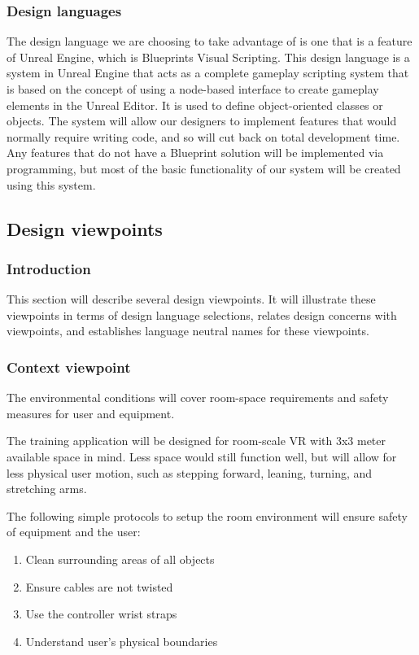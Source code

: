 \documentclass[onecolumn, draftclsnofoot,10pt, compsoc]{IEEEtran}
\begin{document}
\subsubsection{Design languages}
The design language we are choosing to take advantage of is one that is a feature of Unreal Engine, which is Blueprints Visual Scripting. This design language is a system in Unreal Engine that acts as a complete gameplay scripting system that is based on the concept of using a node-based interface to create gameplay elements in the Unreal Editor. It is used to define object-oriented classes or objects. The system will allow our designers to implement features that would normally require writing code, and so will cut back on total development time. Any features that do not have a Blueprint solution will be implemented via programming, but most of the basic functionality of our system will be created using this system.

\newpage

\subsection{Design viewpoints}
\subsubsection{Introduction}
This section will describe several design viewpoints. It will illustrate these viewpoints in terms of design language selections, relates design concerns with viewpoints, and establishes language neutral names for these viewpoints. 

\subsubsection{Context viewpoint}
The environmental conditions will cover room-space requirements and safety measures for user and equipment.

The training application will be designed for room-scale VR with 3x3 meter available space in mind. Less space would still function well, but will allow for less physical user motion, such as stepping forward, leaning, turning, and stretching arms. 

The following simple protocols to setup the room environment will ensure safety of equipment and the user:
\begin{enumerate}
    \item Clean surrounding areas of all objects
    \item Ensure cables are not twisted
    \item Use the controller wrist straps
    \item Understand user's physical boundaries
\end{enumerate}
\end{document}
